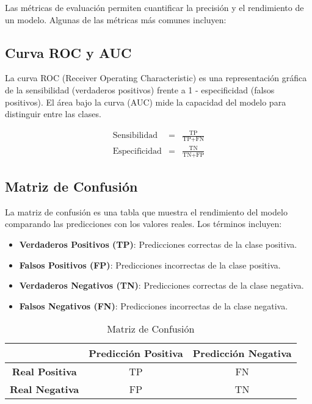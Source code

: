 \documentclass[a4paper]{report} %
\begin{document}
Las métricas de evaluación permiten cuantificar la precisión y el rendimiento de un modelo. Algunas de las métricas más comunes incluyen:

\subsection{Curva ROC y AUC}

La curva ROC (Receiver Operating Characteristic) es una representación gráfica de la sensibilidad (verdaderos positivos) frente a 1 - especificidad (falsos positivos). El área bajo la curva (AUC) mide la capacidad del modelo para distinguir entre las clases.

\begin{eqnarray*}
\text{Sensibilidad} &=& \frac{\text{TP}}{\text{TP} + \text{FN}} \\
\text{Especificidad} &=& \frac{\text{TN}}{\text{TN} + \text{FP}}
\end{eqnarray*}

\subsection{Matriz de Confusión}

La matriz de confusión es una tabla que muestra el rendimiento del modelo comparando las predicciones con los valores reales. Los términos incluyen:
\begin{itemize}
    \item \textbf{Verdaderos Positivos (TP)}: Predicciones correctas de la clase positiva.
    \item \textbf{Falsos Positivos (FP)}: Predicciones incorrectas de la clase positiva.
    \item \textbf{Verdaderos Negativos (TN)}: Predicciones correctas de la clase negativa.
    \item \textbf{Falsos Negativos (FN)}: Predicciones incorrectas de la clase negativa.
\end{itemize}

\begin{table}[h]
\centering
\begin{tabular}{|c|c|c|}
\hline
 & \textbf{Predicción Positiva} & \textbf{Predicción Negativa} \\
\hline
\textbf{Real Positiva} & TP & FN \\
\hline
\textbf{Real Negativa} & FP & TN \\
\hline
\end{tabular}
\caption{Matriz de Confusión}
\label{tab:confusion_matrix}
\end{table}
\end{document}
